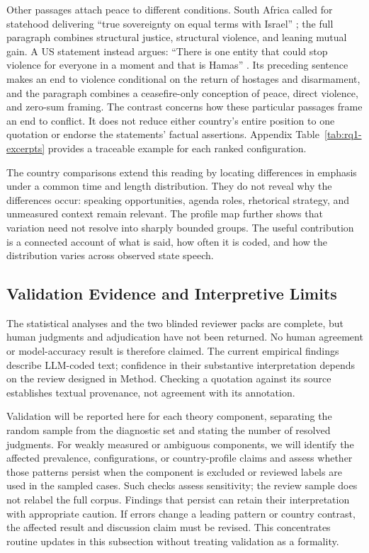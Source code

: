 \documentclass[sigconf,review,anonymous,balance=false]{acmart}
\begin{document}
Other passages attach peace to different conditions. South Africa called
for statehood delivering ``true sovereignty on equal terms with Israel''
\cite[p.~41]{UNSC10023R1}; the full paragraph combines structural justice,
structural violence, and leaning mutual gain.
A US statement instead argues: ``There is one entity that could stop
violence for everyone in a moment and that is Hamas''
\cite[p.~17]{UNSC9891}. Its preceding sentence makes an end to violence
conditional on the return of hostages and disarmament, and the paragraph
combines a ceasefire-only conception of peace, direct violence, and zero-sum
framing. The contrast concerns how these particular passages
frame an end to conflict. It does not reduce either country's entire
position to one quotation or endorse the statements' factual assertions.
Appendix Table~\ref{tab:rq1-excerpts} provides a traceable example for each
ranked configuration.

The country comparisons extend this reading by locating differences in
emphasis under a common time and length distribution. They do not reveal
why the differences occur: speaking opportunities, agenda roles, rhetorical
strategy, and unmeasured context remain relevant. The profile map further
shows that variation need not resolve into sharply bounded groups.
The useful contribution is a connected account of what is said, how often
it is coded, and how the distribution varies across observed state speech.

\subsection{Validation Evidence and Interpretive Limits}
\label{sec:validation}
The statistical analyses and the two blinded reviewer packs are complete,
but human judgments and adjudication have not been returned. No human
agreement or model-accuracy result is therefore claimed. The current
empirical findings describe LLM-coded text; confidence in their substantive
interpretation depends on the review designed in Method. Checking a quotation
against its source establishes textual provenance, not agreement with its annotation.

Validation will be reported here for each theory component, separating the random sample
from the diagnostic set and stating the number of resolved judgments.
For weakly measured or ambiguous components, we will identify the affected prevalence,
configurations, or country-profile claims and assess whether those patterns
persist when the component is excluded or reviewed labels are used in the sampled
cases. Such checks assess sensitivity; the review sample does not relabel
the full corpus. Findings that persist can retain their interpretation with
appropriate caution. If errors change a leading pattern or country contrast,
the affected result and discussion claim must be revised. This concentrates
routine updates in this subsection without treating validation as a formality.
\end{document}
